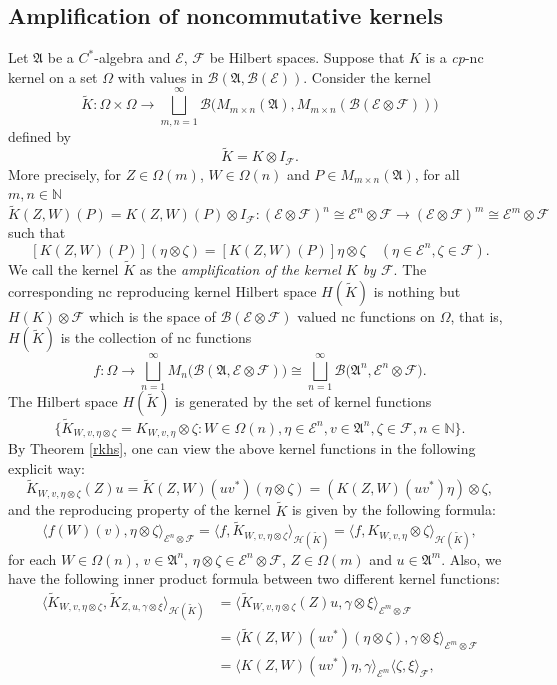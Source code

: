 \documentclass[12pt]{amsart}%
\numberwithin{equation}{section}
\newcommand{\cB}{\mathcal{B}}
\newcommand{\cE}{\mathcal{E}}
\newcommand{\cF}{\mathcal{F}}
\newcommand{\bN}{\mathbb{N}}
\newcommand{\fA}{{\mathfrak{A}}}
\newcommand{\clb}{\mathcal{B}}
\newcommand{\cle}{\mathcal{E}}
\newcommand{\clf}{\mathcal{F}}
\newcommand{\clh}{\mathcal{H}}
\begin{document}
\subsection{Amplification of noncommutative kernels}
Let $\fA$ be a $C^*$-algebra and $\cE$, $\cF$ be Hilbert spaces. Suppose that $K$ is a \textit{cp}-nc kernel on a set $\Omega$ with values in $\clb(\fA,\clb(\cE))$. Consider the kernel  
\[
\tilde{K}:\Omega \times \Omega \to  \bigsqcup_{m, n=1}^\infty \clb \big(M_{m\times n}(\fA), M_{m\times n}(\clb(\cle \otimes \clf))\big) 
\]
defined by 
\[\tilde{K}=K \otimes I_\clf.\]
More precisely, for $Z\in\Omega(m)$, $W\in \Omega(n)$ and $P\in M_{m\times n}(\fA)$, for all $m,n\in\bN$
\[
\tilde{K}(Z,W)(P)=K(Z,W)(P)\otimes I_{\clf}:(\cle\otimes \clf)^n \cong \cle^n \otimes \clf\to (\cle\otimes \clf)^m\cong \cle^m \otimes \clf
\]
such that 
 \[
 [K(Z,W)(P)](\eta\otimes \zeta)=[K(Z,W)(P)]\eta\otimes \zeta\quad(\eta\in\cle^n, \zeta\in\clf).
 \]
 We call the kernel $\tilde{K}$ as the \textit{amplification of the kernel $K$ by $\clf$}. The corresponding nc reproducing kernel Hilbert space $H(\tilde{K})$ is nothing but $H(K)\otimes\cF$ which is the space of $\clb(\cE\otimes\cF)$ valued nc functions on $\Omega$, that is, $H(\tilde{K})$ is the collection of nc functions 
\[
    f:\Omega\to\bigsqcup_{n=1}^{\infty} M_n\big(\cB(\fA, \cE\otimes\cF)\big)\cong\bigsqcup_{n=1}^{\infty} \cB\big(\fA^n, \cE^n\otimes\cF\big).
\]
The Hilbert space $H(\tilde{K})$ is generated by the set of kernel functions 
\[
\big\{\tilde{K}_{W,v,\eta\otimes\zeta}=K_{W,v,\eta}\otimes \zeta: W\in\Omega(n), \eta\in\cE^n, v\in\fA^n,\zeta\in\clf, n\in \bN\big\}.
\]
By Theorem \ref{rkhs}, one can view the above kernel functions in the following explicit way:
\begin{equation}\label{kernel formula}
\tilde{K}_{W, v, \eta\otimes \zeta}(Z)u=\tilde{K}(Z,W)(uv^*) (\eta\otimes \zeta)= (K(Z,W)(uv^*) \eta) \otimes \zeta,
\end{equation}
and the reproducing property of the kernel $\tilde{K}$ is given by the following formula: 
\begin{equation}\label{reproducing property}
\langle f(W)(v), \eta\otimes \zeta\rangle_{\cle^n\otimes \clf}=\langle f, \tilde{K}_{W, v, \eta\otimes \zeta}\rangle_{\clh(\tilde{K})}=\langle f, K_{W, v, \eta} \otimes \zeta\rangle_{\clh(\tilde{K})},
\end{equation}
for each $W\in \Omega(n)$, $v\in \fA^n$, $\eta\otimes \zeta\in \cle^n\otimes \clf$, $Z\in \Omega(m)$ and $u\in \fA^m$. Also, we have the following inner product formula between two different kernel functions:
\begin{align*}
\langle \tilde{K}_{W, v, \eta\otimes \zeta} , \tilde{K}_{Z, u, \gamma\otimes \xi} \rangle_{\clh(\tilde{K})}&=\langle \tilde{K}_{W, v, \eta\otimes \zeta}(Z)u, \gamma\otimes \xi\rangle_{\cle^m \otimes \clf} \nonumber\\
&=\langle \tilde{K}(Z,W)(uv^*)(\eta\otimes \zeta),\gamma\otimes \xi \rangle_{\cle^m \otimes \clf}\nonumber\\
&=\langle K(Z,W)(uv^*)\eta, \gamma \rangle_{\cle^m} \langle \zeta, \xi \rangle_\clf,
\end{align*}
\end{document}
